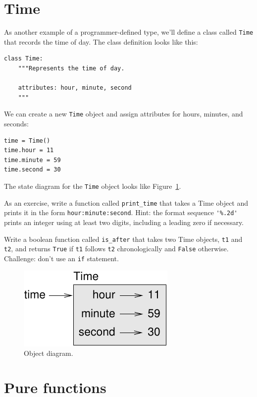 \documentclass[10pt]{book}
\begin{document}
\section{Time}
\label{isafter}

As another example of a programmer-defined type, we'll define a class
called {\tt Time} that records the time of day.  The class definition
looks like this: 
  

\begin{verbatim}
class Time:
    """Represents the time of day.
       
    attributes: hour, minute, second
    """
\end{verbatim}
%
We can create a new {\tt Time} object and assign
attributes for hours, minutes, and seconds:

\begin{verbatim}
time = Time()
time.hour = 11
time.minute = 59
time.second = 30
\end{verbatim}
%
The state diagram for the {\tt Time} object looks like Figure~\ref{fig.time}.

As an exercise, write a function called \verb"print_time" that takes a 
Time object and prints it in the form {\tt hour:minute:second}.
Hint: the format sequence \verb"'%.2d'" prints an integer using
at least two digits, including a leading zero if necessary.

Write a boolean function called \verb"is_after" that
takes two Time objects, {\tt t1} and {\tt t2}, and
returns {\tt True} if {\tt t1} follows {\tt t2} chronologically and
{\tt False} otherwise.  Challenge: don't use an {\tt if} statement.

\begin{figure}
\centerline
{\includegraphics[scale=0.8]{figs/time.pdf}}
\caption{Object diagram.}
\label{fig.time}
\end{figure}


\section{Pure functions}
\end{document}
